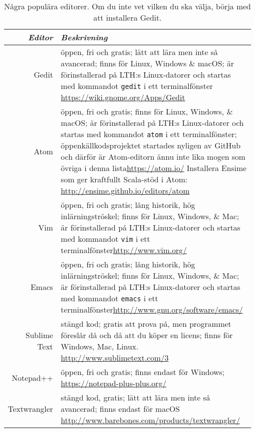 \begin{table}[T]

\renewcommand{\arraystretch}{1.25}

\begin{tabular}{@{}r | p{}}
\textit{Editor} & \textit{Beskrivning} \\ \hline

Gedit & öppen, fri och gratis; lätt att lära men inte så avancerad; finns för Linux, Windows \& macOS; är förinstallerad på LTH:s Linux-datorer och startas med kommandot \verb+gedit+ i ett terminalfönster\newline  
 \url{https://wiki.gnome.org/Apps/Gedit} \\

Atom & öppen, fri och gratis; finns för Linux, Windows, \& macOS; är förinstallerad på LTH:s Linux-datorer och startas med kommandot \verb+atom+ i ett terminalfönster; öppenkällkodsprojektet startades nyligen av GitHub och därför är Atom-editorn ännu inte lika mogen som övriga i denna lista\newline \url{https://atom.io/} \newline 
Installera Ensime som ger kraftfullt Scala-stöd i Atom: \newline \url{http://ensime.github.io/editors/atom}\\


Vim & öppen, fri och gratis; lång historik, hög inlärningströskel; finns för Linux, Windows, \& Mac; är förinstallerad på LTH:s Linux-datorer och startas med kommandot \verb+vim+ i ett terminalfönster\newline \url{http://www.vim.org/} \\

Emacs & öppen, fri och gratis; lång historik, hög inlärningströskel; finns för Linux, Windows, \& Mac; är förinstallerad på LTH:s Linux-datorer och startas med kommandot \verb+emacs+ i ett terminalfönster\newline \url{http://www.gnu.org/software/emacs/} \\

Sublime Text& stängd kod; gratis att prova på, men programmet föreslår då och då att du köper en licens; finns för Windows, Mac, Linux. \newline
 \url{http://www.sublimetext.com/3} \\


Notepad++ & öppen, fri och gratis; finns endast för Windows; \newline \url{https://notepad-plus-plus.org/} \\


Textwrangler & stängd kod, gratis; lätt att lära men inte så avancerad; finns endast för macOS  
\newline \url{http://www.barebones.com/products/textwrangler/} \\

\end{tabular}
    \caption{Några populära editorer. Om du inte vet vilken du ska välja, börja med att installera Gedit.}
    \label{edit:popular-editors}
\end{table}
